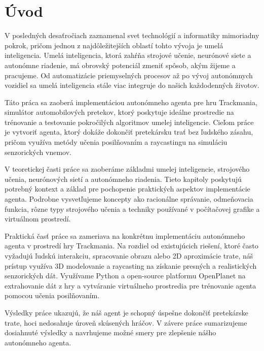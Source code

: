 \chapter*{Úvod} %

V posledných desaťročiach zaznamenal svet technológií a informatiky mimoriadny pokrok, pričom jednou z najdôležitejších oblastí tohto vývoja je umelá inteligencia. Umelá inteligencia, ktorá zahŕňa strojové učenie, neurónové siete a autonómne riadenie, má obrovský potenciál zmeniť spôsob, akým žijeme a pracujeme. Od automatizácie priemyselných procesov až po vývoj autonómnych vozidiel sa umelá inteligencia stále viac integruje do našich každodenných životov.

Táto práca sa zaoberá implementáciou autonómneho agenta pre hru Trackmania, simulátor automobilových pretekov, ktorý poskytuje ideálne prostredie na trénovanie a testovanie pokročilých algoritmov umelej inteligencie. Cieľom práce je vytvoriť agenta, ktorý dokáže dokončiť pretekársku trať bez ľudského zásahu, pričom využíva metódy učenia posilňovaním a raycastingu na simuláciu senzorických vnemov.

V teoretickej časti práce sa zaoberáme základmi umelej inteligencie, strojového učenia, neurónových sietí a autonómneho riadenia. Tieto kapitoly poskytujú potrebný kontext a základ pre pochopenie praktických aspektov implementácie agenta. Podrobne vysvetľujeme koncepty ako racionálne správanie, odmeňovacia funkcia, rôzne typy strojového učenia a techniky používané v počítačovej grafike a virtuálnom prostredí.

Praktická časť práce sa zameriava na konkrétnu implementáciu autonómneho agenta v prostredí hry Trackmania. Na rozdiel od existujúcich riešení, ktoré často vyžadujú ľudskú interakciu, spracovanie obrazu alebo 2D aproximácie trate, náš prístup využíva 3D modelovanie a raycasting na získanie presných a realistických senzorických dát. Využívame Python a open-source platformu OpenPlanet na extrahovanie dát z hry a vytváranie virtuálneho prostredia pre trénovanie agenta pomocou učenia posilňovaním.

Výsledky práce ukazujú, že náš agent je schopný úspešne dokončiť pretekárske trate, hoci nedosahuje úroveň skúsených hráčov. V závere práce sumarizujeme dosiahnuté výsledky a navrhujeme možné smery pre zlepšenie nášho autonómneho agenta.


